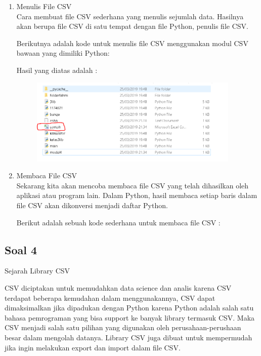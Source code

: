 \begin{enumerate} 
	\item Menulis File CSV \\
	Cara membuat file CSV sederhana yang menulis sejumlah data. Hasilnya akan berupa file CSV di satu tempat dengan file Python, penulis file CSV.
	
	Berikutnya adalah kode untuk menulis file CSV menggunakan modul CSV bawaan yang dimiliki Python:
	
	
	
	Hasil yang diatas adalah : 
	\begin{figure}[H]
		\includegraphics[width=10cm]{figures/4/1174021/Teori/8.png}
		\centering
	\end{figure}

	\item Membaca File CSV \\
	Sekarang kita akan mencoba membaca file CSV yang telah dihasilkan oleh aplikasi atau program lain. Dalam Python, hasil membaca setiap baris dalam file CSV akan dikonversi menjadi daftar Python.
	
	Berikut adalah sebuah kode sederhana untuk membaca file CSV :
	
\end{enumerate}


\subsection{Soal 4}
Sejarah Library CSV

CSV diciptakan untuk memudahkan data science dan analis karena CSV terdapat beberapa kemudahan dalam menggunakannya, CSV dapat dimaksimalkan jika dipadukan dengan Python karena Python adalah salah satu bahasa pemrograman yang bisa support ke banyak library termasuk CSV. Maka CSV menjadi salah satu pilihan yang digunakan oleh perusahaan-perushaan besar dalam mengolah datanya. Library CSV juga dibuat untuk mempermudah jika ingin melakukan export dan import dalam file CSV.

